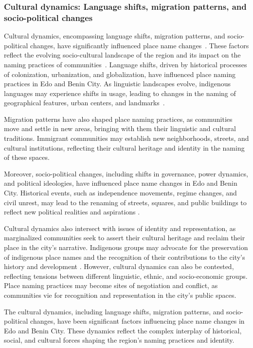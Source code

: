 \subsubsection{Cultural dynamics: Language shifts, migration patterns, and socio-political changes}
Cultural dynamics, encompassing language shifts, migration patterns, and socio-political changes, have significantly influenced place name changes~\cite{lanati2021cultural}. These factors reflect the evolving socio-cultural landscape of the region and its impact on the naming practices of communities~\cite{aigimoukhuede2018benin}.
Language shifts, driven by historical processes of colonization, urbanization, and globalization, have influenced place naming practices in Edo and Benin City. As linguistic landscapes evolve, indigenous languages may experience shifts in usage, leading to changes in the naming of geographical features, urban centers, and landmarks~\cite{egharevba1968short}.

Migration patterns have also shaped place naming practices, as communities move and settle in new areas, bringing with them their linguistic and cultural traditions. Immigrant communities may establish new neighborhoods, streets, and cultural institutions, reflecting their cultural heritage and identity in the naming of these spaces.

Moreover, socio-political changes, including shifts in governance, power dynamics, and political ideologies, have influenced place name changes in Edo and Benin City. Historical events, such as independence movements, regime changes, and civil unrest, may lead to the renaming of streets, squares, and public buildings to reflect new political realities and aspirations \cite{aigimoukhuede2018benin,egharevba1968short}.

Cultural dynamics also intersect with issues of identity and representation, as marginalized communities seek to assert their cultural heritage and reclaim their place in the city's narrative. Indigenous groups may advocate for the preservation of indigenous place names and the recognition of their contributions to the city's history and development \cite{egharevba1968short}.
However, cultural dynamics can also be contested, reflecting tensions between different linguistic, ethnic, and socio-economic groups. Place naming practices may become sites of negotiation and conflict, as communities vie for recognition and representation in the city's public spaces.

The cultural dynamics, including language shifts, migration patterns, and socio-political changes, have been significant factors influencing place name changes in Edo and Benin City. These dynamics reflect the complex interplay of historical, social, and cultural forces shaping the region's naming practices and identity.
